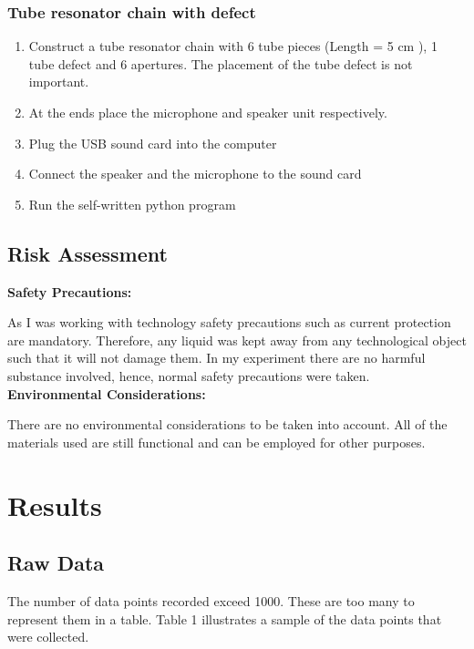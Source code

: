 \documentclass[12pt]{article}
\begin{document}
\subsubsection{Tube resonator chain with defect}
\begin{enumerate}
	\item Construct a tube resonator chain with 6 tube pieces (Length = 5 cm ), 1 tube defect and 6 apertures. The placement of the tube defect is not important.
	\item At the ends place the microphone and speaker unit respectively.
	\item Plug the USB sound card into the computer
	\item Connect the speaker and the microphone to the sound card
	\item Run the self-written python program	
\end{enumerate}
\subsection{Risk Assessment}
{\bf Safety Precautions:}

As I was working with technology safety precautions such as current protection are mandatory. Therefore, any liquid was kept away from any technological object such that it will not damage them. In my experiment there are no harmful substance involved, hence, normal safety precautions were taken. 
\\
{\bf Environmental Considerations:}

There are no environmental considerations to be taken into account. All of the materials used are still functional and can be employed for other purposes.
\section{Results}
\subsection{Raw Data}
The number of data points recorded exceed 1000. These are too many to represent them in a table. Table 1 illustrates a sample of the data points that were collected.
\end{document}
